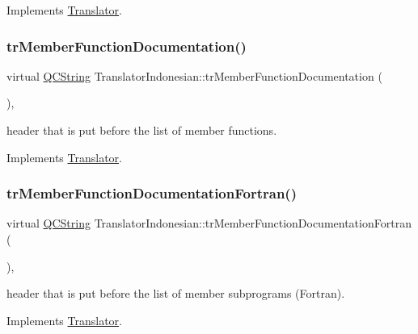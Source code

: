 Implements \mbox{\hyperlink{class_translator}{Translator}}.

\mbox{\label{class_translator_indonesian_a5bc701cc5aba0e16a5bd265ad458a5dd}} 
\subsubsection{\texorpdfstring{trMemberFunctionDocumentation()}{trMemberFunctionDocumentation()}}
{\footnotesize\ttfamily virtual \mbox{\hyperlink{class_q_c_string}{Q\+C\+String}} Translator\+Indonesian\+::tr\+Member\+Function\+Documentation (\begin{DoxyParamCaption}{ }\end{DoxyParamCaption})\hspace{0.3cm}{\ttfamily [inline]}, {\ttfamily [virtual]}}

header that is put before the list of member functions. 

Implements \mbox{\hyperlink{class_translator}{Translator}}.

\mbox{\label{class_translator_indonesian_a73d636f40870477629500c60d740a214}} 
\subsubsection{\texorpdfstring{trMemberFunctionDocumentationFortran()}{trMemberFunctionDocumentationFortran()}}
{\footnotesize\ttfamily virtual \mbox{\hyperlink{class_q_c_string}{Q\+C\+String}} Translator\+Indonesian\+::tr\+Member\+Function\+Documentation\+Fortran (\begin{DoxyParamCaption}{ }\end{DoxyParamCaption})\hspace{0.3cm}{\ttfamily [inline]}, {\ttfamily [virtual]}}

header that is put before the list of member subprograms (Fortran). 

Implements \mbox{\hyperlink{class_translator}{Translator}}.


